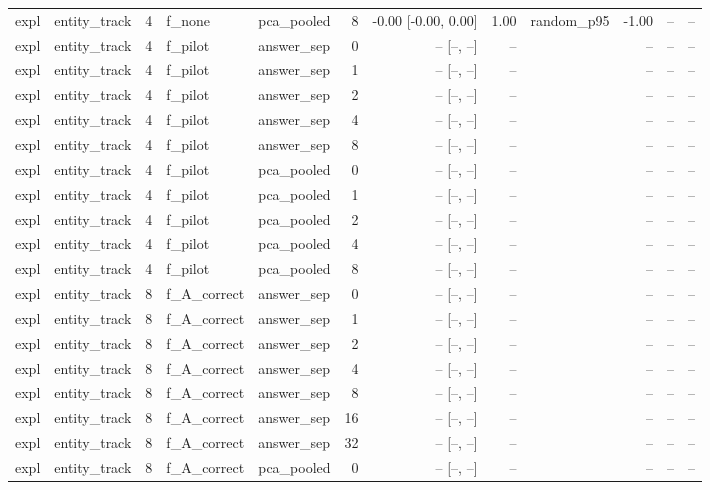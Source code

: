 \begin{tabular}{llrllrrrlrrr}
expl & entity\_track & 4 & f\_none & pca\_pooled & 8 & -0.00 [-0.00, 0.00] & 1.00 & random\_p95 & -1.00 & -- & -- \\
expl & entity\_track & 4 & f\_pilot & answer\_sep & 0 & -- [--, --] & -- &  & -- & -- & -- \\
expl & entity\_track & 4 & f\_pilot & answer\_sep & 1 & -- [--, --] & -- &  & -- & -- & -- \\
expl & entity\_track & 4 & f\_pilot & answer\_sep & 2 & -- [--, --] & -- &  & -- & -- & -- \\
expl & entity\_track & 4 & f\_pilot & answer\_sep & 4 & -- [--, --] & -- &  & -- & -- & -- \\
expl & entity\_track & 4 & f\_pilot & answer\_sep & 8 & -- [--, --] & -- &  & -- & -- & -- \\
expl & entity\_track & 4 & f\_pilot & pca\_pooled & 0 & -- [--, --] & -- &  & -- & -- & -- \\
expl & entity\_track & 4 & f\_pilot & pca\_pooled & 1 & -- [--, --] & -- &  & -- & -- & -- \\
expl & entity\_track & 4 & f\_pilot & pca\_pooled & 2 & -- [--, --] & -- &  & -- & -- & -- \\
expl & entity\_track & 4 & f\_pilot & pca\_pooled & 4 & -- [--, --] & -- &  & -- & -- & -- \\
expl & entity\_track & 4 & f\_pilot & pca\_pooled & 8 & -- [--, --] & -- &  & -- & -- & -- \\
expl & entity\_track & 8 & f\_A\_correct & answer\_sep & 0 & -- [--, --] & -- &  & -- & -- & -- \\
expl & entity\_track & 8 & f\_A\_correct & answer\_sep & 1 & -- [--, --] & -- &  & -- & -- & -- \\
expl & entity\_track & 8 & f\_A\_correct & answer\_sep & 2 & -- [--, --] & -- &  & -- & -- & -- \\
expl & entity\_track & 8 & f\_A\_correct & answer\_sep & 4 & -- [--, --] & -- &  & -- & -- & -- \\
expl & entity\_track & 8 & f\_A\_correct & answer\_sep & 8 & -- [--, --] & -- &  & -- & -- & -- \\
expl & entity\_track & 8 & f\_A\_correct & answer\_sep & 16 & -- [--, --] & -- &  & -- & -- & -- \\
expl & entity\_track & 8 & f\_A\_correct & answer\_sep & 32 & -- [--, --] & -- &  & -- & -- & -- \\
expl & entity\_track & 8 & f\_A\_correct & pca\_pooled & 0 & -- [--, --] & -- &  & -- & -- & -- \\

\end{tabular}
